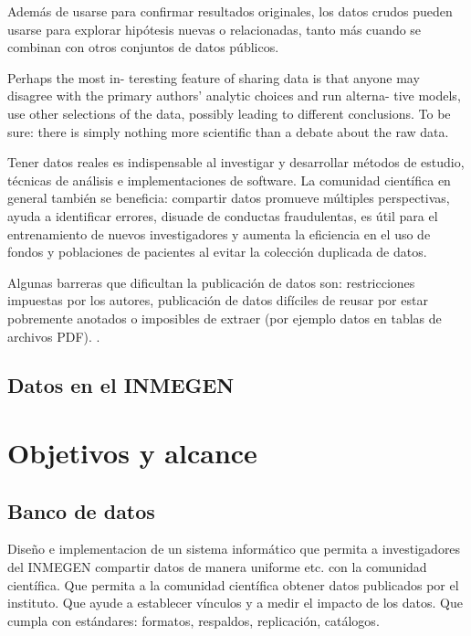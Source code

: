 \documentclass[
10pt, %
letterpaper, %
oneside, %
headinclude,footinclude, %
BCOR5mm, %
]{scrartcl}
\begin{document}
Además de usarse para confirmar resultados originales, los datos
crudos pueden usarse para explorar hipótesis nuevas o relacionadas,
tanto más cuando se combinan con otros conjuntos de datos públicos.

Perhaps the most in-
teresting feature of sharing data is that anyone may disagree
with the primary authors' analytic choices and run alterna-
tive models, use other selections of the data, possibly leading
to different conclusions. To be sure: there is simply nothing
more scientific than a debate about the raw data. 

Tener datos reales es indispensable al investigar y desarrollar
métodos de estudio, técnicas de análisis e implementaciones de
software. La comunidad científica en general también se beneficia:
compartir datos promueve múltiples perspectivas, ayuda a identificar
errores, disuade de conductas fraudulentas, es útil para el
entrenamiento de nuevos investigadores y aumenta la eficiencia en el
uso de fondos y poblaciones de pacientes al evitar la colección
duplicada de datos.\cite{piwowar_sharing_2007}

Algunas barreras que dificultan la publicación de datos son:
restricciones impuestas por los autores, publicación de datos
difíciles de reusar por estar pobremente anotados o imposibles de
extraer (por ejemplo datos en tablas de archivos PDF).
\cite{molloy_open_2011}.




\subsection{Datos en el INMEGEN}



\section{Objetivos y alcance}


\subsection{Banco de datos}

Diseño e implementacion de un sistema informático que permita a
investigadores del INMEGEN compartir datos de manera uniforme etc. con
la comunidad científica. Que permita a la comunidad científica obtener
datos publicados por el instituto. Que ayude a establecer vínculos y a
medir el impacto de los datos. Que cumpla con estándares: formatos,
respaldos, replicación, catálogos.
\cite{_data_????}
\cite{altman_proposed_2007}
\end{document}
